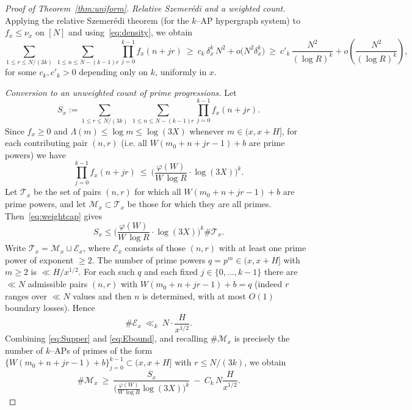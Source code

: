 \documentclass[11pt]{amsart}
\theoremstyle{definition}
\theoremstyle{remark}
\numberwithin{equation}{section}
\begin{document}
\begin{proof}[Proof of Theorem~\ref{thm:uniform}]
\smallskip
\noindent\emph{Relative Szemerédi and a weighted count.}
Applying the relative Szemerédi theorem (for the $k$–AP hypergraph system) to $f_x\le\nu_x$ on $[N]$ and using~\eqref{eq:density}, we obtain
\begin{equation}\label{eq:RSZ}
\sum_{1\le r\le N/(3k)}\ \sum_{1\le n\le N-(k-1)r}\prod_{j=0}^{k-1} f_x(n+jr)\ \ge\ c_k\,\delta_x^{k}\,N^{2}+o\big(N^{2}\delta_x^{k}\big)\ \ge\ c'_k\,\frac{N^{2}}{(\log R)^{k}}+o\!\left(\frac{N^{2}}{(\log R)^{k}}\right),
\end{equation}
for some $c_k,c'_k>0$ depending only on $k$, uniformly in $x$.

\smallskip
\noindent\emph{Conversion to an unweighted count of prime progressions.}
Let
\[
S_x:=\sum_{1\le r\le N/(3k)}\ \sum_{1\le n\le N-(k-1)r}\prod_{j=0}^{k-1} f_x(n+jr).
\]
Since $f_x\ge0$ and $\Lambda(m)\le\log m\le\log(3X)$ whenever $m\in(x,x+H]$, for each contributing pair $(n,r)$ (i.e. all $W(m_0+n+jr-1)+b$ are prime powers) we have
\begin{equation}\label{eq:weightcap}
\prod_{j=0}^{k-1} f_x(n+jr)\ \le\ \Bigg(\frac{\varphi(W)}{W\,\log R}\cdot\log(3X)\Bigg)^{\!k}.
\end{equation}
Let $\mathcal T_x$ be the set of pairs $(n,r)$ for which all $W(m_0+n+jr-1)+b$ are prime powers, and let $\mathcal M_x\subset\mathcal T_x$ be those for which they are all primes. Then~\eqref{eq:weightcap} gives
\begin{equation}\label{eq:Supper}
S_x\le \Bigg(\frac{\varphi(W)}{W\,\log R}\cdot\log(3X)\Bigg)^{\!k}\#\mathcal T_x.
\end{equation}
Write $\mathcal T_x=\mathcal M_x\sqcup\mathcal E_x$, where $\mathcal E_x$ consists of those $(n,r)$ with at least one prime power of exponent $\ge2$. The number of prime powers $q=p^m\in(x,x+H]$ with $m\ge2$ is $\ll H/x^{1/2}$. For each such $q$ and each fixed $j\in\{0,\dots,k-1\}$ there are $\ll N$ admissible pairs $(n,r)$ with $W(m_0+n+jr-1)+b=q$ (indeed $r$ ranges over $\ll N$ values and then $n$ is determined, with at most $O(1)$ boundary losses). Hence
\begin{equation}\label{eq:Ebound}
\#\mathcal E_x\ \ll_k\ N\cdot\frac{H}{x^{1/2}}.
\end{equation}
Combining \eqref{eq:Supper} and \eqref{eq:Ebound}, and recalling $\#\mathcal M_x$ is precisely the number of $k$–APs of primes of the form $\{W(m_0+n+jr-1)+b\}_{j=0}^{k-1}\subset(x,x+H]$ with $r\le N/(3k)$, we obtain
\begin{equation}\label{eq:Mlower1}
\#\mathcal M_x\ \ge\ \frac{S_x}{\big(\tfrac{\varphi(W)}{W\,\log R}\log(3X)\big)^{k}}\ -\ C_k\,N\frac{H}{x^{1/2}}.

\end{equation}
\end{proof}
\end{document}
